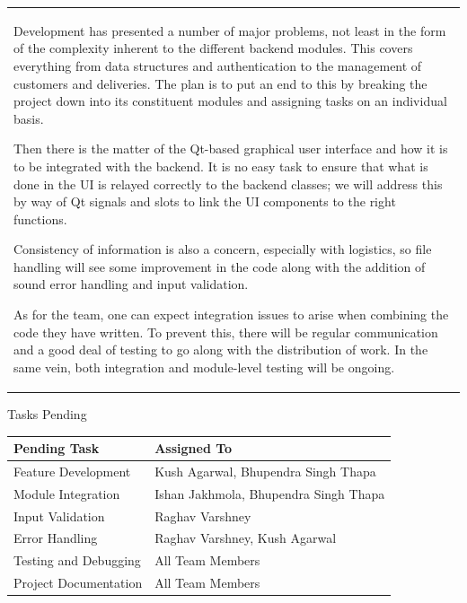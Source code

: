 \documentclass[12pt,a4paper]{article}
\newcommand{\sectiontitle}[1]{%
    {\color{GEUBlue}
    \fontsize{18}{22}\selectfont #1}
}
\newcommand{\answerbox}[2]{%
    \begin{tabularx}{\textwidth}{
        |>{\raggedright\arraybackslash}X|}
        \hline
        \parbox[t][#1][t]{\dimexpr\linewidth-12pt\relax}{
            \vspace{5pt}
            \fontsize{11}{13}\selectfont #2
        }\\
        \hline
    \end{tabularx}
}
\begin{document}
\answerbox{6.05cm}{Development has presented a number of major problems, not least in the form of the complexity inherent to the different backend modules. This covers everything from data structures and authentication to the management of customers and deliveries. The plan is to put an end to this by breaking the project down into its constituent modules and assigning tasks on an individual basis.

Then there is the matter of the Qt-based graphical user interface and how it is to be integrated with the backend. It is no easy task to ensure that what is done in the UI is relayed correctly to the backend classes; we will address this by way of Qt signals and slots to link the UI components to the right functions.

Consistency of information is also a concern, especially with logistics, so file handling will see some improvement in the code along with the addition of sound error handling and input validation.

As for the team, one can expect integration issues to arise when combining the code they have written. To prevent this, there will be regular communication and a good deal of testing to go along with the distribution of work. In the same vein, both integration and module-level testing will be ongoing.}

\vspace{0.65cm}


\sectiontitle{Tasks Pending}

\vspace{0.50cm}

\begin{tabularx}{\textwidth}{
|>{\raggedright\arraybackslash}X
|>{\raggedright\arraybackslash}p{}|
}
\hline
\textbf{Pending Task} & \textbf{Assigned To} \\
\hline

Feature Development &
Kush Agarwal, Bhupendra Singh Thapa \\
\hline

Module Integration &
Ishan Jakhmola, Bhupendra Singh Thapa \\
\hline

Input Validation &
Raghav Varshney \\
\hline

Error Handling &
Raghav Varshney, Kush Agarwal \\
\hline

Testing and Debugging &
All Team Members \\
\hline

Project Documentation &
All Team Members \\
\hline

\end{tabularx}
\end{document}
